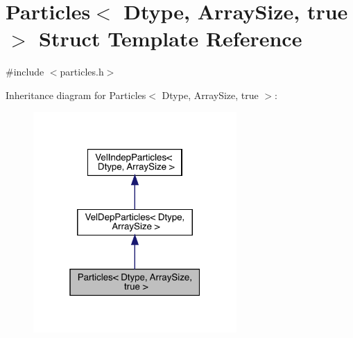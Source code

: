 \hypertarget{struct_particles_3_01_dtype_00_01_array_size_00_01true_01_4}{}\section{Particles$<$ Dtype, Array\+Size, true $>$ Struct Template Reference}
\label{struct_particles_3_01_dtype_00_01_array_size_00_01true_01_4}


{\ttfamily \#include $<$particles.\+h$>$}



Inheritance diagram for Particles$<$ Dtype, Array\+Size, true $>$\+:\nopagebreak
\begin{figure}[H]
\begin{center}
\leavevmode
\includegraphics[width=220pt]{struct_particles_3_01_dtype_00_01_array_size_00_01true_01_4__inherit__graph}
\end{center}
\end{figure}



